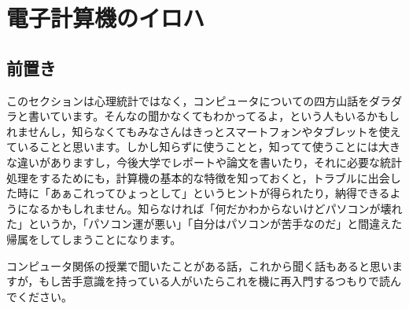 \documentclass{ltjsbook}
\begin{document}
\chapter{電子計算機のイロハ}
\label{computer}

\section{前置き}
このセクションは心理統計ではなく，コンピュータについての四方山話をダラダラと書いています。そんなの聞かなくてもわかってるよ，という人もいるかもしれませんし，知らなくてもみなさんはきっとスマートフォンやタブレットを使えていることと思います。しかし知らずに使うことと，知ってて使うことには大きな違いがありますし，今後大学でレポートや論文を書いたり，それに必要な統計処理をするためにも，計算機の基本的な特徴を知っておくと，トラブルに出会した時に「あぁこれってひょっとして」というヒントが得られたり，納得できるようになるかもしれません。知らなければ「何だかわからないけどパソコンが壊れた」というか，「パソコン運が悪い」「自分はパソコンが苦手なのだ」と間違えた帰属をしてしまうことになります。

コンピュータ関係の授業で聞いたことがある話，これから聞く話もあると思いますが，もし苦手意識を持っている人がいたらこれを機に再入門するつもりで読んでください。
\end{document}
